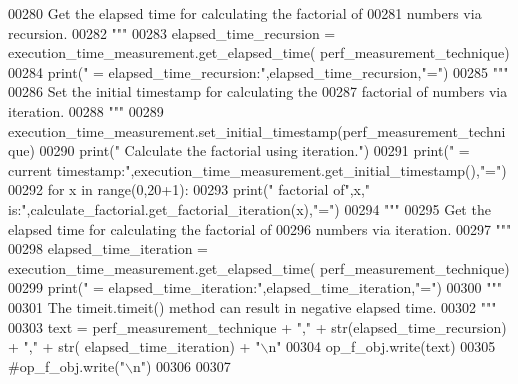 \begin{DoxyCode}
00280 \textcolor{stringliteral}{                    Get the elapsed time for calculating the factorial of}
00281 \textcolor{stringliteral}{                        numbers via recursion.}
00282 \textcolor{stringliteral}{                """}
00283                 elapsed\_time\_recursion = execution\_time\_measurement.get\_elapsed\_time(
      perf\_measurement\_technique)
00284                 print(\textcolor{stringliteral}{" = elapsed\_time\_recursion:"},elapsed\_time\_recursion,\textcolor{stringliteral}{"="})
00285                 \textcolor{stringliteral}{"""}
00286 \textcolor{stringliteral}{                    Set the initial timestamp for calculating the}
00287 \textcolor{stringliteral}{                        factorial of numbers via iteration.}
00288 \textcolor{stringliteral}{                """}
00289                 execution\_time\_measurement.set\_initial\_timestamp(perf\_measurement\_technique)
00290                 print(\textcolor{stringliteral}{" Calculate the factorial using iteration."})
00291                 print(\textcolor{stringliteral}{" = current timestamp:"},execution\_time\_measurement.get\_initial\_timestamp(),\textcolor{stringliteral}{"="})
00292                 \textcolor{keywordflow}{for} x \textcolor{keywordflow}{in} range(0,20+1):
00293                     print(\textcolor{stringliteral}{"     factorial of"},x,\textcolor{stringliteral}{" is:"},calculate\_factorial.get\_factorial\_iteration(x),\textcolor{stringliteral}{"="})
00294                 \textcolor{stringliteral}{"""}
00295 \textcolor{stringliteral}{                    Get the elapsed time for calculating the factorial of}
00296 \textcolor{stringliteral}{                        numbers via iteration.}
00297 \textcolor{stringliteral}{                """}
00298                 elapsed\_time\_iteration = execution\_time\_measurement.get\_elapsed\_time(
      perf\_measurement\_technique)
00299                 print(\textcolor{stringliteral}{" = elapsed\_time\_iteration:"},elapsed\_time\_iteration,\textcolor{stringliteral}{"="})
00300                 \textcolor{stringliteral}{"""}
00301 \textcolor{stringliteral}{                    The timeit.timeit() method can result in negative elapsed time.}
00302 \textcolor{stringliteral}{                """}
00303                 text = perf\_measurement\_technique + \textcolor{stringliteral}{","} + str(elapsed\_time\_recursion) + \textcolor{stringliteral}{","} + str(
      elapsed\_time\_iteration) + \textcolor{stringliteral}{"\(\backslash\)n"}
00304                 op\_f\_obj.write(text)
00305                 \textcolor{comment}{#op\_f\_obj.write("\(\backslash\)n")}
00306 
00307 
\end{DoxyCode}
